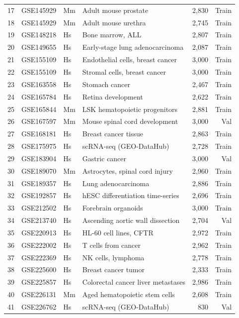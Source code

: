 {\begin{longtable}{rllp{4.2cm}rr}
  17 & GSE145929 & Mm & Adult mouse prostate & 2,830 & Train \\
  18 & GSE145929 & Mm & Adult mouse urethra & 2,745 & Train \\
  19 & GSE148218 & Hs & Bone marrow, ALL & 2,807 & Train \\
  20 & GSE149655 & Hs & Early-stage lung adenocarcinoma & 2,087 & Train \\
  21 & GSE155109 & Hs & Endothelial cells, breast cancer & 3,000 & Train \\
  22 & GSE155109 & Hs & Stromal cells, breast cancer & 3,000 & Train \\
  23 & GSE163558 & Hs & Stomach cancer & 2,467 & Train \\
  24 & GSE165784 & Hs & Retina development & 2,622 & Train \\
  25 & GSE165844 & Mm & LSK hematopoietic progenitors & 2,881 & Train \\
  26 & GSE167597 & Mm & Mouse spinal cord development & 3,000 & Val \\
  27 & GSE168181 & Hs & Breast cancer tissue & 2,863 & Train \\
  28 & GSE175975 & Hs & scRNA-seq (GEO-DataHub) & 2,728 & Train \\
  29 & GSE183904 & Hs & Gastric cancer & 3,000 & Val \\
  30 & GSE189070 & Mm & Astrocytes, spinal cord injury & 2,960 & Train \\
  31 & GSE189357 & Hs & Lung adenocarcinoma & 2,886 & Train \\
  32 & GSE192857 & Hs & hESC differentiation time-series & 2,696 & Train \\
  33 & GSE212502 & Hs & Forebrain organoids & 3,000 & Train \\
  34 & GSE213740 & Hs & Ascending aortic wall dissection & 2,704 & Val \\
  35 & GSE220913 & Hs & HL-60 cell lines, CFTR & 2,972 & Train \\
  36 & GSE222002 & Hs & T cells from cancer & 2,962 & Train \\
  37 & GSE222369 & Hs & NK cells, lymphoma & 2,778 & Train \\
  38 & GSE225600 & Hs & Breast cancer tumor & 2,333 & Train \\
  39 & GSE225857 & Hs & Colorectal cancer liver metastases & 2,986 & Train \\
  40 & GSE226131 & Mm & Aged hematopoietic stem cells & 2,608 & Train \\
  41 & GSE226762 & Hs & scRNA-seq (GEO-DataHub) & 830 & Val \\

\end{longtable}}
